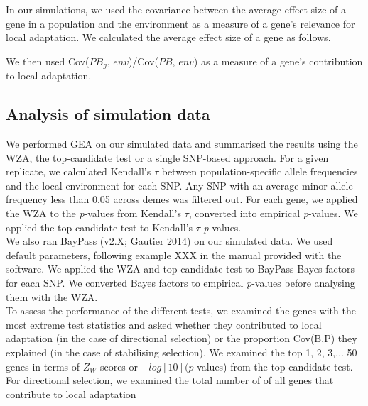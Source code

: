 \documentclass[11pt,twoside,lineno]{GSA_format}
\begin{document}


In our simulations, we used the covariance between the average effect size of a gene in a population and the environment as a measure of a gene's relevance for local adaptation. We calculated the average effect size of a gene as follows.

We then used Cov($PB_g$, $env$)/Cov($PB$, $env$) as a measure of a gene's contribution to local adaptation.


\subsection{Analysis of simulation data}

We performed GEA on our simulated data and summarised the results using the WZA, the top-candidate test or a single SNP-based approach. For a given replicate, we calculated Kendall's $\tau$ between population-specific allele frequencies and the local environment for each SNP. Any SNP with an average minor allele frequency less than 0.05 across demes was filtered out. For each gene, we applied the WZA to the \textit{p}-values from Kendall's $\tau$, converted into empirical \textit{p}-values. We applied the top-candidate test to Kendall's $\tau$ \textit{p}-values. \\

We also ran BayPass (v2.X; Gautier 2014) on our simulated data. We used default parameters, following example XXX in the manual provided with the software. We applied the WZA and top-candidate test to BayPass Bayes factors for each SNP. We converted Bayes factors to empirical \textit{p}-values before analysing them with the WZA. \\

To assess the performance of the different tests, we examined the genes with the most extreme test statistics and asked whether they contributed to local adaptation (in the case of directional selection) or the proportion Cov(B,P) they explained (in the case of stabilising selection). We examined the top 1, 2, 3,... 50 genes in terms of $Z_W$ scores or $-log[10](p$-values) from the top-candidate test.  For directional selection, we examined the total number of  of all genes that contribute to local adaptation \\
\end{document}
